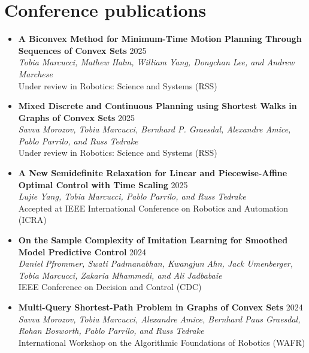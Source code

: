 \documentclass[11pt,a4paper,sans]{moderncv}
\begin{document}
\section{Conference publications}

\vspace{5pt}

\begin{itemize}
	
\item \textbf{A Biconvex Method for Minimum-Time Motion Planning Through Sequences of Convex Sets} \hfill 2025 \\
\textit{Tobia Marcucci, Mathew Halm, William Yang, Dongchan Lee, and Andrew Marchese } \\
Under review in Robotics: Science and Systems (RSS)

\item \textbf{Mixed Discrete and Continuous Planning using Shortest Walks in Graphs of Convex Sets} \hfill 2025 \\
\textit{Savva Morozov, Tobia Marcucci, Bernhard P. Graesdal, Alexandre Amice, Pablo Parrilo, and Russ Tedrake} \\
Under review in Robotics: Science and Systems (RSS)
	
\item \textbf{A New Semidefinite Relaxation for Linear and Piecewise-Affine Optimal Control with Time Scaling} \hfill 2025 \\
\textit{Lujie Yang, Tobia Marcucci, Pablo Parrilo, and Russ Tedrake} \\
Accepted at IEEE International Conference on Robotics and Automation (ICRA)
	
\item \textbf{On the Sample Complexity of Imitation Learning for Smoothed Model Predictive Control} \hfill 2024 \\
\textit{Daniel Pfrommer, Swati Padmanabhan, Kwangjun Ahn, Jack Umenberger, Tobia Marcucci, Zakaria Mhammedi, and Ali Jadbabaie} \\
IEEE Conference on Decision and Control (CDC)
	
\item \textbf{Multi-Query Shortest-Path Problem in Graphs of Convex Sets} \hfill 2024 \\
\textit{Savva Morozov, Tobia Marcucci, Alexandre Amice, Bernhard Paus Graesdal,  Rohan Bosworth,  Pablo Parrilo, and Russ Tedrake} \\
International Workshop on the Algorithmic Foundations of Robotics (WAFR)


\end{itemize}
\end{document}
